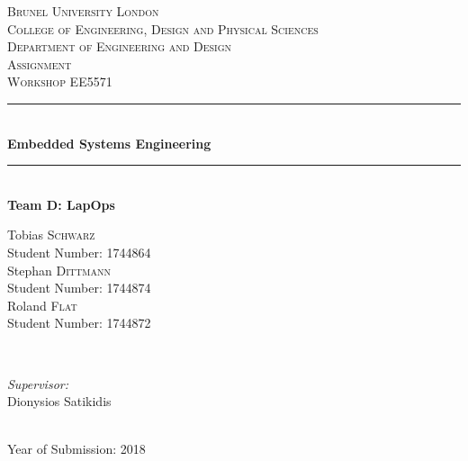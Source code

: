 \documentclass[13pt, a4paper,headinclude, 
footinclude, 
plainfootsepline]{scrreprt} %
\newcommand{\theuniversity}{Brunel University London}
\newcommand{\thecollege}{College of Engineering, Design and Physical Sciences}
\newcommand{\thedepartment}{Department of Engineering and Design}
\newcommand{\thecoursetitle}{Assignment \\ Workshop EE5571}
\newcommand{\thestudent}{Tobias \textsc{Schwarz}}
\newcommand{\thestudentid}{1744864}
\newcommand{\thestudenttwo}{Stephan \textsc{Dittmann}}
\newcommand{\thestudentidtwo}{1744874}
\newcommand{\thestudentthree}{Roland \textsc{Flat}}
\newcommand{\thestudentidthree}{1744872}
\newcommand{\thesupervisor}{Dionysios Satikidis}
\newcommand{\theyear}{2018}
\newcommand{\thetitle}{Embedded Systems Engineering}
\theoremstyle{plain}
\theoremstyle{definition}
\begin{document}
	
	
	
\onehalfspacing


\begin{titlepage}
	\center
	
	\textsc{\LARGE \theuniversity} \\[1.5cm] 
	\textsc{\large 
		\thecollege \\
		\thedepartment} \\[1.5cm]
	\textsc{\Large \thecoursetitle} \\[3.0cm]
	
	\rule{\linewidth}{0.5mm} \\[0.5cm]
	{ \huge\textbf{ \thetitle } } \\
	\rule{\linewidth}{0.5mm} \\[2cm]
	{ \large\textbf{ Team D: LapOps } } \\[2cm]
	
	\begin{minipage}{0.4\textwidth}
		\begin{flushleft} \large
			\thestudent \\
			Student Number: \thestudentid \\
			\thestudenttwo \\
			Student Number: \thestudentidtwo \\
			\thestudentthree \\
			Student Number: \thestudentidthree
		\end{flushleft}
	\end{minipage}
	~
	\begin{minipage}{0.4\textwidth}
		\begin{flushright} \large
			\emph{Supervisor:} \\
			\thesupervisor
		\end{flushright}
	\end{minipage}\\[1cm]
	
	{\large Year of Submission: \theyear} \\[3cm] 
	
	\vfill %
\end{titlepage}
\newpage

\end{document}
